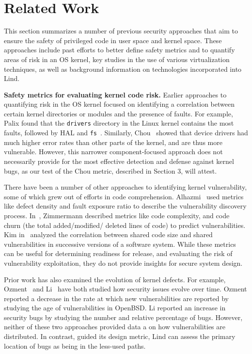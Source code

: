 \section{Related Work}
\label{sec.related_work}

This section summarizes a number of previous security approaches
that aim to ensure the safety of privileged code in user space and kernel space.
These approaches include past efforts to better define safety metrics and to quantify
areas of risk in an OS kernel, key studies in the use of various virtualization
 techniques, as well as background information on technologies incorporated into
 Lind.

\textbf{Safety metrics for evaluating kernel code risk.}
Earlier approaches to quantifying risk
in the OS kernel focused on identifying a correlation between certain
kernel directories or modules and the presence of faults. For example,
Palix found that the \texttt{drivers} directory in the Linux kernel contains the
most faults, followed by HAL and \texttt{fs}~\cite{palix2011faults}. Similarly,
Chou~\cite{PittSFIeld} showed that device drivers had
much higher error rates than other parts of the kernel, and are thus more vulnerable.
However, this narrower component-focused approach does not necessarily
provide for the most effective detection and defense against kernel bugs, as our
test of the Chou metric, described in Section 3, will attest.

There have been a number of other approaches to identifying kernel vulnerability, some of
which grew out of efforts in code comprehension.  Alhazmi~\cite{alhazmi2008application}
used metrics like defect density and fault exposure ratio to describe the
vulnerability discovery process. In~\cite{zimmermann2010searching}, Zimmermann
described metrics like code complexity, and code churn (the total added/modified/
deleted lines of code) to predict vulnerabilities. Kim in~\cite{kim2007vulnerability} analyzed
the correlation between shared code size and shared vulnerabilities in
successive versions of a software system. While
these metrics can be useful for determining readiness for release, and
evaluating the risk of vulnerability exploitation,
they do not provide insights for secure system design.

Prior work has also examined the evolution of kernel defects. For example,
Ozment~\cite{ozment2006milk} and Li~\cite{li2006have} have
both studied how security issues evolve over
time. Ozment reported a decrease in the rate at which new vulnerabilities
are reported by studying the age of vulnerabilities in OpenBSD.  Li
reported an increase in security bugs by studying the number and relative
percentage of bugs. 
However, neither of these two approaches provided data
a on how vulnerabilities are distributed.
In contrast, guided its design metric, Lind can assess the primary location
of bugs as being in the less-used paths.

